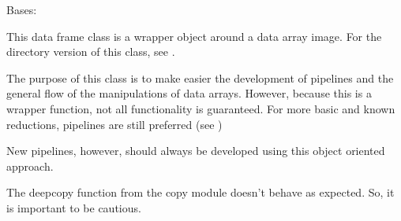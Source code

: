 \documentclass[letterpaper,10pt,english]{sphinxmanual}
\begin{document}
\begin{fulllineitems}
\label{\detokenize{python_docstrings/IfA_Smeargle.zulu.zulu_main:IfA_Smeargle.zulu.zulu_main.IfasDataArray}}
Bases: 

This data frame class is a wrapper object around a data array image.
For the directory version of this class, see
.

The purpose of this class is to make easier the development of pipelines
and the general flow of the manipulations of data arrays. However, because
this is a wrapper function, not all functionality is guaranteed. For
more basic and known reductions, pipelines are still preferred (see
{\hyperref[\detokenize{python_docstrings/IfA_Smeargle.zulu.detector_pipelines::doc}]{}})

New pipelines, however, should always be developed using this object
oriented approach.

\begin{fulllineitems}
\label{\detokenize{python_docstrings/IfA_Smeargle.zulu.zulu_main:IfA_Smeargle.zulu.zulu_main.IfasDataArray.__deepcopy__}}
The deepcopy function from the copy module doesn’t behave as
expected. So, it is important to be cautious.

\end{fulllineitems}


\begin{fulllineitems}
\label{\detokenize{python_docstrings/IfA_Smeargle.zulu.zulu_main:IfA_Smeargle.zulu.zulu_main.IfasDataArray.config}}
\end{fulllineitems}


\end{fulllineitems}
\end{document}
